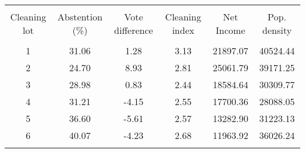 
\begingroup 
\scriptsize 
\begin{tabular}{@{\extracolsep{5pt}} cccccc} 
\\[-1.8ex]\hline 
\hline \\[-1.8ex] 
Cleaning lot & Abstention (\%) & Vote difference & Cleaning index & Net Income & Pop. density \\ 
\hline \\[-1.8ex] 
1 & 31.06 & 1.28 & 3.13 & 21897.07 & 40524.44 \\ 
2 & 24.70 & 8.93 & 2.81 & 25061.79 & 39171.25 \\ 
3 & 28.98 & 0.83 & 2.44 & 18584.64 & 30309.77 \\ 
4 & 31.21 & -4.15 & 2.55 & 17700.36 & 28088.05 \\ 
5 & 36.60 & -5.61 & 2.57 & 13282.90 & 31223.13 \\ 
6 & 40.07 & -4.23 & 2.68 & 11963.92 & 36026.24 \\ 
\hline \\[-1.8ex] 
\end{tabular} 
\endgroup 
